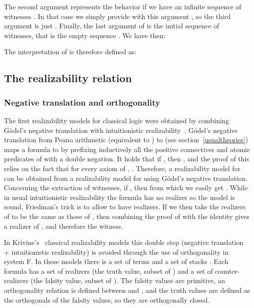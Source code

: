 \documentclass{CSML}
\begin{document}
The second argument represents the behavior if we have an infinite sequence of witnesses . In that case we simply provide  with this argument , so the third argument is just . Finally, the last argument of  is the initial sequence of witnesses, that is the empty sequence . We have then:

The interpretation of  is therefore defined as:

\subsection{The realizability relation}
\subsubsection{Negative translation and orthogonality}
\label{NegTrans}
The first realizability models for classical logic were obtained by combining G\"odel's negative translation with intuitionistic realizability~\cite{BerardiBezemCoquand,BergerOlivaChoice,KohlenbachProofTheory}. G\"odel's negative translation from Peano arithmetic  (equivalent to ) to  (see section~\ref{usualtheories}) maps a formula  to  by prefixing inductively all the positive connectives and atomic predicates of  with a double negation. It holds that if , then , and the proof of this relies on the fact that for every axiom  of , . Therefore, a realizability model for  can be obtained from a realizability model for  using G\"odel's negative translation. Concerning the extraction of witnesses, if , then  from which we easily get . While in usual intuitionistic realizability the formula  has no realizer so the model is sound, Friedman's trick is to allow  to have realizers. If we then take the realizers of  to be the same as those of , then combining the proof of  with the identity gives a realizer of , and therefore the witness.\par
In Krivine's~\cite{KrivinePanoramas} classical realizability models this double step (negative translation + intuitionistic realizability) is avoided through the use of orthogonality in system F. In these models there is a set of terms  and a set of stacks . Each formula has a set of realizers (the truth value, subset of ) and a set of counter-realizers (the falsity value, subset of ). The falsity values are primitive, an orthogonality relation is defined between  and , and the truth values are defined as the orthogonals of the falsity values, so they are orthogonally closed.\par
\end{document}
